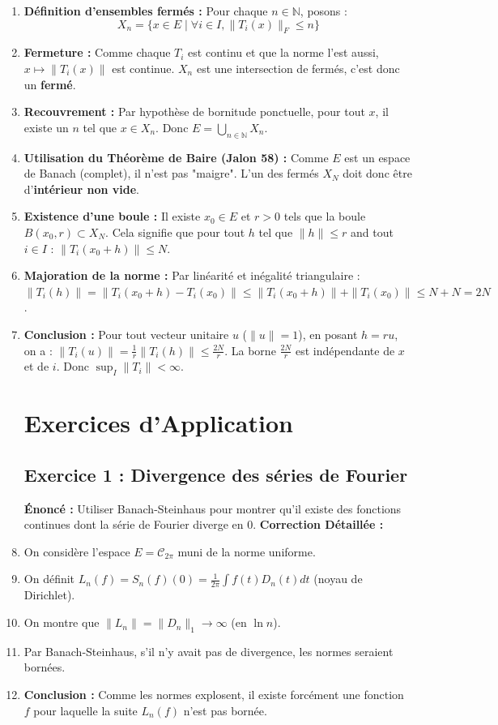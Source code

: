 \documentclass[11pt,a4paper]{article}
\begin{document}
\begin{enumerate}
\item \textbf{Définition d'ensembles fermés :} Pour chaque $n \in \mathbb{N}$, posons :
   $$X_n = \{ x \in E \mid \forall i \in I, \|T_i(x)\|_F \le n \}$$
\item \textbf{Fermeture :} Comme chaque $T_i$ est continu et que la norme l'est aussi, $x \mapsto \|T_i(x)\|$ est continue. $X_n$ est une intersection de fermés, c'est donc un \textbf{fermé}.
\item \textbf{Recouvrement :} Par hypothèse de bornitude ponctuelle, pour tout $x$, il existe un $n$ tel que $x \in X_n$.
   Donc $E = \bigcup_{n \in \mathbb{N}} X_n$.
\item \textbf{Utilisation du Théorème de Baire (Jalon 58) :} Comme $E$ est un espace de Banach (complet), il n'est pas "maigre". L'un des fermés $X_N$ doit donc être d'\textbf{intérieur non vide}.
\item \textbf{Existence d'une boule :} Il existe $x_0 \in E$ et $r > 0$ tels que la boule $B(x_0, r) \subset X_N$.
   Cela signifie que pour tout $h$ tel que $\|h\| \le r$ and tout $i \in I$ :
   $\|T_i(x_0 + h)\| \le N$.
\item \textbf{Majoration de la norme :} Par linéarité et inégalité triangulaire :
   $\|T_i(h)\| = \|T_i(x_0+h) - T_i(x_0)\| \le \|T_i(x_0+h)\| + \|T_i(x_0)\| \le N + N = 2N$.
\item \textbf{Conclusion :} Pour tout vecteur unitaire $u$ ($\|u\|=1$), en posant $h = r u$, on a :
   $\|T_i(u)\| = \frac{1}{r} \|T_i(h)\| \le \frac{2N}{r}$.
   La borne $\frac{2N}{r}$ est indépendante de $x$ et de $i$. Donc $\sup_I \|T_i\| < \infty$.

\section{Exercices d'Application}

\subsection{Exercice 1 : Divergence des séries de Fourier}
\textbf{Énoncé :} Utiliser Banach-Steinhaus pour montrer qu'il existe des fonctions continues dont la série de Fourier diverge en 0.
\textbf{Correction Détaillée :}
\item On considère l'espace $E = \mathcal{C}_{2\pi}$ muni de la norme uniforme.
\item On définit $L_n(f) = S_n(f)(0) = \frac{1}{2\pi} \int f(t) D_n(t) dt$ (noyau de Dirichlet).
\item On montre que $\|L_n\| = \|D_n\|_1 \to \infty$ (en $\ln n$).
\item Par Banach-Steinhaus, s'il n'y avait pas de divergence, les normes seraient bornées.
\item \textbf{Conclusion :} Comme les normes explosent, il existe forcément une fonction $f$ pour laquelle la suite $L_n(f)$ n'est pas bornée.


\end{enumerate}
\end{document}

